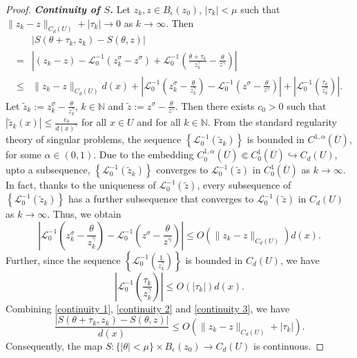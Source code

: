 \documentclass[reqno,oneside]{amsart}
\theoremstyle{definition}
\theoremstyle{remark}
\numberwithin{equation}{section}
\newcommand{\rar}{\rightarrow}
\newcommand{\sn}{\mathbb{N}}
\newcommand{\si}{\sigma}
\newcommand{\ball}{B_{\epsilon} (z_0)}
\newcommand{\li}{\mathcal{L}_0^{-1}}
\begin{document}
\begin{proof}
    \textit{\textbf{Continuity of $S$.}} Let $z_k, z \in \ball$, $|\tau_k| < \mu $ such that $\| z_k -z \|_{C_d (U)} + |\tau_k | \rar 0 $ as $k\rar\infty$. Then
    \begin{align}\label{continuity 1}
        &\left|S(\theta + \tau_k, z_k) - S(\theta, z) \right|\nonumber\\
        = &\left|(z_k -z) - \li \left(z_k^{\si} - z^{\si} \right) + \li \left( \frac{\theta+ \tau_k}{z_k^{\gamma}} - \frac{\theta}{z^{\gamma}} \right)\right|\nonumber\\
        \leq &\|z_k -z\|_{C_d (U)} d(x) + \left|\li \left(z_k^{\si} - \frac{\theta}{z_k^{\gamma}} \right) - \li \left(z^{\si} - \frac{\theta}{z^{\gamma}} \right) \right| + \left|\li \left(\frac{\tau_k}{z_k^{\gamma}} \right)\right|.
    \end{align}
    Let $\tilde{z}_k := z_k^{\si} - \frac{\theta}{z_k^{\gamma}}$, $k\in \sn$ and $\tilde{z}:= z^{\si} - \frac{\theta}{z^{\gamma}}$. Then there exists $c_0>0$ such that $\left|\tilde{z}_k (x) \right| \leq \frac{c_0}{d(x)^{\gamma}}$ for all $x\in U$ and for all $k\in\sn$. From the standard regularity theory of singular problems, the sequence $\left\{ \li (\tilde{z}_k)\right\}$ is bounded in $C^{1, \alpha} (\overline{U}) $, for some $\alpha\in (0,1)$. Due to the embedding $C^{1, \alpha}_0 (\overline{U}) \Subset C^1_0 (\overline{U}) \hookrightarrow C_d (U)$, upto a subsequence, $\left\{\li (\tilde{z}_k)\right\}$ converges to $\li (\tilde{z})$ in $C^1_0 (\overline{U})$ as $k\rar\infty$. In fact, thanks to the uniqueness of $\li (\tilde{z})$, every subsequence of $\left\{\li (\tilde{z}_k ) \right\}$ has a further subsequence that converges to $\li (\tilde{z})$ in $C_d (U)$ as $k\rar\infty$. Thus, we obtain
    \begin{equation}\label{continuity 2}
        \left|\li \left(z_k^{\si} - \frac{\theta}{z_k^{\gamma}} \right) - \li \left(z^{\si} - \frac{\theta}{z^{\gamma}} \right) \right| \leq O\left(\|z_k - z\|_{C_d (U)}\right) d(x).
    \end{equation}
    Further, since the sequence $\left\{\li \left(\frac{1}{z_k^{\gamma}} \right)\right\}$ is bounded in $C_d (U)$, we have
    \begin{equation}\label{continuity 3}
        \left|\li \left(\frac{\tau_k}{z_k^{\gamma}} \right)\right| \leq O\left(|\tau_k|\right) d(x).
    \end{equation}
    Combining \eqref{continuity 1}, \eqref{continuity 2} and \eqref{continuity 3}, we have
    \[ \frac{\left|S(\theta + \tau_k, z_k) - S(\theta, z) \right|}{d(x)} \leq O\left(\|z_k - z\|_{C_d (U)} + |\tau_k|\right). \]
    Consequently, the map $S: \{|\theta| < \mu \} \times B_{\epsilon} (z_0) \rar C_d (U)$ is continuous.
    \vspace{5pt}


\end{proof}
\end{document}
